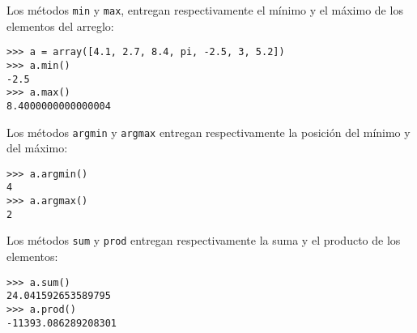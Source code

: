 Los métodos \lstinline!min! y \lstinline!max!, entregan respectivamente
el mínimo y el máximo de los elementos del arreglo:

\begin{lstlisting}
>>> a = array([4.1, 2.7, 8.4, pi, -2.5, 3, 5.2])
>>> a.min()
-2.5
>>> a.max()
8.4000000000000004
\end{lstlisting}

Los métodos \lstinline!argmin! y \lstinline!argmax! entregan
respectivamente la posición del mínimo y del máximo:

\begin{lstlisting}
>>> a.argmin()
4
>>> a.argmax()
2
\end{lstlisting}

Los métodos \lstinline!sum! y \lstinline!prod! entregan respectivamente
la suma y el producto de los elementos:

\begin{lstlisting}
>>> a.sum()
24.041592653589795
>>> a.prod()
-11393.086289208301
\end{lstlisting}

